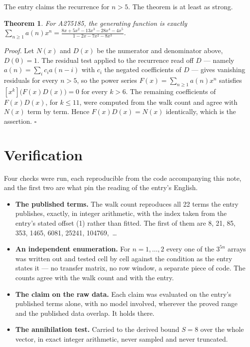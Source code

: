 \documentclass[11pt]{article}
\newtheorem{theorem}{Theorem}
\theoremstyle{definition}
\begin{document}
The entry claims the recurrence for $n > 5$. The theorem is at least as strong.

\begin{theorem} For A275185, the generating function is exactly $\sum_{n\ge 1} a(n)x^n = \frac{8x + 5x^{2} - 13x^{3} - 28x^{4} - 4x^{5}}{1 - 2x - 7x^{2} - 8x^{3}}$.\end{theorem}

{\itshape Proof.} Let $N(x)$ and $D(x)$ be the numerator and denominator above, $D(0)=1$. The residual test applied to the recurrence read off $D$ --- namely $a(n) = \sum_i c_i a(n-i)$ with $c_i$ the negated coefficients of $D$ --- gives vanishing residuals for every $n > 5$, so the power series $F(x)=\sum_{n\ge 1}a(n)x^n$ satisfies $[x^k]\bigl(F(x)D(x)\bigr) = 0$ for every $k > 6$. The remaining coefficients of $F(x)D(x)$, for $k \le 11$, were computed from the walk count and agree with $N(x)$ term by term. Hence $F(x)D(x) = N(x)$ identically, which is the assertion. $\square$

\section{Verification}

Four checks were run, each reproducible from the code accompanying this note, and the first two are what pin the reading of the entry's English.

\begin{itemize}

\item {\bfseries The published terms.} The walk count reproduces all 22 terms the entry publishes, exactly, in integer arithmetic, with the index taken from the entry's stated offset (1) rather than fitted. The first of them are 8, 21, 85, 353, 1465, 6081, 25241, 104769,~\dots

\item {\bfseries An independent enumeration.} For $n = 1,\dots,2$ every one of the $3^{5n}$ arrays was written out and tested cell by cell against the condition as the entry states it --- no transfer matrix, no row window, a separate piece of code. The counts agree with the walk count and with the entry.

\item {\bfseries The claim on the raw data.} Each claim was evaluated on the entry's published terms alone, with no model involved, wherever the proved range and the published data overlap. It holds there.

\item {\bfseries The annihilation test.} Carried to the derived bound $S = 8$ over the whole vector, in exact integer arithmetic, never sampled and never truncated.

\end{itemize}
\end{document}
